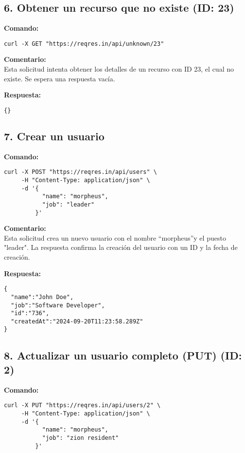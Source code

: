 \documentclass[12pt,a4paper]{article}
\begin{document}
\subsection{6. Obtener un recurso que no existe (ID: 23)}
\textbf{Comando:}
\begin{samepage}
\begin{verbatim}
curl -X GET "https://reqres.in/api/unknown/23"
\end{verbatim}
\end{samepage}

\textbf{Comentario:}\\
Esta solicitud intenta obtener los detalles de un recurso con ID 23, el cual no existe. Se espera una respuesta vacía.

\textbf{Respuesta:}
\begin{samepage}
\begin{verbatim}
{}
\end{verbatim}
\end{samepage}

\subsection{7. Crear un usuario}
\textbf{Comando:}
\begin{samepage}
\begin{verbatim}
curl -X POST "https://reqres.in/api/users" \
     -H "Content-Type: application/json" \
     -d '{
           "name": "morpheus",
           "job": "leader"
         }'
\end{verbatim}
\end{samepage}

\textbf{Comentario:}\\
Esta solicitud crea un nuevo usuario con el nombre \textquotedblleft morpheus\textquotedblright y el puesto "leader". La respuesta confirma la creación del usuario con un ID y la fecha de creación.

\textbf{Respuesta:}
\begin{samepage}
\begin{verbatim}
{
  "name":"John Doe",
  "job":"Software Developer",
  "id":"736",
  "createdAt":"2024-09-20T11:23:58.289Z"
}
\end{verbatim}
\end{samepage}

\subsection{8. Actualizar un usuario completo (PUT) (ID: 2)}
\textbf{Comando:}
\Needspace{20\baselineskip}
\begin{samepage}
\begin{verbatim}
curl -X PUT "https://reqres.in/api/users/2" \
     -H "Content-Type: application/json" \
     -d '{
           "name": "morpheus",
           "job": "zion resident"
         }'
\end{verbatim}
\end{samepage}
\end{document}
